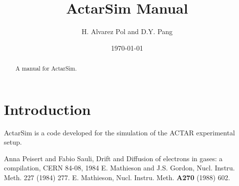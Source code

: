 \documentclass[a4paper,10pt]{article}
\title{ActarSim Manual}
\author{H. Alvarez Pol and D.Y. Pang}
\date{\today}
\begin{document}
\graphicspath{{figures/}}
\maketitle

\begin{abstract}
A manual for ActarSim.
\end{abstract}

\tableofcontents

\section{Introduction}
ActarSim is a code developed for the simulation of the ACTAR experimental setup.






\printindex

\begin{thebibliography}{999}
 Anna Peisert and Fabio Sauli, Drift and Diffusion of electrons in gases: a compilation, CERN 84-08, 1984
 E. Mathieson and J.S. Gordon, Nucl. Instru. Meth. 227 (1984) 277.
 E. Mathieson, Nucl. Instru. Meth. \textbf{A270} (1988) 602.
\end{thebibliography}
\end{document}
